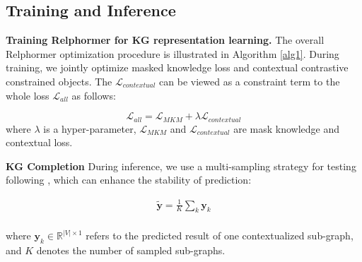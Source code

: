 \documentclass[sigconf]{acmart}
\newcommand{\bizhen}[1]{{\color{black}#1}}
\begin{document}
\subsection{Training and Inference}
\label{sec:downtream_task}
\textbf{Training Relphormer for KG representation learning.}
The overall Relphormer optimization procedure is illustrated in \bizhen{Algorithm \ref{alg1}}.
During training, we jointly optimize masked knowledge loss and contextual contrastive constrained objects. 
The $\mathcal{L}_{contextual}$ can be viewed as a constraint term to the whole loss $\mathcal{L}_{all}$ as follows:

\begin{equation}
     \mathcal{L}_{all} = \mathcal{L}_{MKM} +  \lambda \mathcal{L}_{contextual}
\end{equation}
where $\lambda$ is a hyper-parameter, $\mathcal{L}_{MKM}$ and $\mathcal{L}_{contextual}$ are mask knowledge and contextual loss.

\textbf{KG Completion}
During inference, we use a multi-sampling strategy for testing following \cite{Gophormer}, which can enhance the stability of prediction:

\begin{equation}
\begin{aligned}
     \widetilde{\boldsymbol{y}} = \frac{1}{K} \sum_{k} \boldsymbol{y}_k \\
\end{aligned}
\end{equation}

where $\boldsymbol{y}_k \in \mathbb{R}^{ \left |  V \right | \times 1}$ refers to the predicted result of one contextualized sub-graph, and $K$ denotes the number of sampled  sub-graphs.
\end{document}
